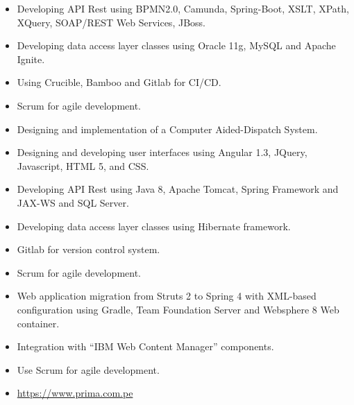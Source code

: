 \documentclass[10pt,a4paper,ragged2e]{altacv}
\begin{document}
\begin{itemize}
    \item Developing API Rest using BPMN2.0, Camunda, Spring-Boot, XSLT, XPath, XQuery, SOAP/REST Web Services, JBoss.
    \item Developing data access layer classes using Oracle 11g, MySQL and Apache Ignite.
    \item Using Crucible, Bamboo and Gitlab for CI/CD.
    \item Scrum for agile development.
\end{itemize}

\vspace{10px}

\begin{itemize}
   \item Designing and implementation of a Computer Aided-Dispatch System.
   \item Designing and developing user interfaces using  Angular 1.3, JQuery, Javascript, HTML 5, and CSS.
   \item Developing API Rest using Java 8, Apache Tomcat, Spring Framework and JAX-WS and SQL Server.
   \item Developing data access layer classes using Hibernate framework.
   \item Gitlab for version control system.
   \item Scrum for agile development.
\end{itemize}

\vspace{10px}

\begin{itemize}
   \item Web application migration from Struts 2 to Spring 4 with XML-based configuration using Gradle, Team Foundation Server and Websphere 8 Web container.
   \item Integration with “IBM Web Content Manager” components.
   \item Use Scrum for agile development.
   \item \url{https://www.prima.com.pe}
\end{itemize}
\end{document}
